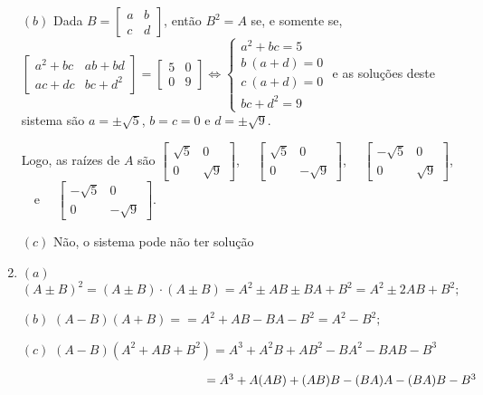 \documentclass{report}
\begin{document}
\begin{enumerate}
$(b)$ Dada $B=\left[
\begin{array}{cc}
a & b \\
c & d
\end{array}
\right] $, então $B^2 =A$ se, e somente se, $\left[
\begin{array}{cc}
a ^2 + bc & ab+bd \\
ac+dc & bc + d^2
\end{array}
\right]  =\left[
\begin{array}{cc}
5 & 0 \\
0 & 9
\end{array}
\right] \Leftrightarrow \left\{
\begin{array}{c}
a ^2 + bc = 5 \\
b \ (a+d) =0 \\
c \ (a+d) =0 \\
bc + d^2 =9
\end{array}\right.$ e as soluções deste sistema são $a = \pm\sqrt{5}$, $b =c=0$ e $d = \pm\sqrt{9}$.

Logo, as raízes de $A$ são $\left[
\begin{array}{cc}
\sqrt{5} & 0 \\
0 & \sqrt{9}
\end{array}
\right]$, \ \ $\left[
\begin{array}{cc}
\sqrt{5} & 0 \\
0 & -\sqrt{9}
\end{array}
\right]$, \ \ $\left[
\begin{array}{cc}
-\sqrt{5} & 0 \\
0 & \sqrt{9}
\end{array}
\right]$, \ \ e \ \ $\left[
\begin{array}{cc}
-\sqrt{5} & 0 \\
0 & -\sqrt{9}
\end{array}
\right]$.

$(c)$ Não, o sistema pode não ter solução



\item $(a)$ $(A\pm B)^2 = (A\pm B) \cdot (A\pm B)= A^2 \pm AB \pm
BA +B^2=A^2 \pm 2AB+B^2; $

$(b)$ $(A-B)(A+B) = = A^2 +AB -BA- B^2=A^2 - B^2;$

$(c)$ $(A-B)(A^2 +AB+B^2)  = A^3 +A^2B +AB^2-BA^2-BAB-B^3$

$\hspace{5.3cm}= A^3 +A(AB) +(AB)B-(BA)A-(BA)B-B^3$


\end{enumerate}
\end{document}
